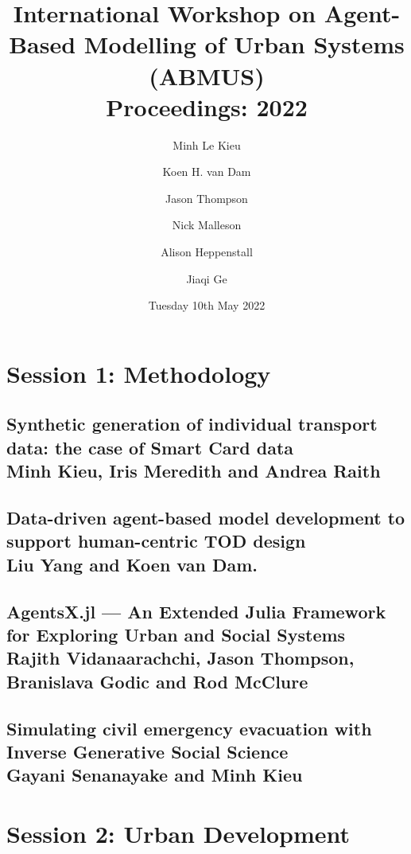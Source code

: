 \documentclass[a4paper,11pt]{article}
\begin{document}
\author{Minh Le Kieu \and Koen H. van Dam\and Jason Thompson \and Nick Malleson \and Alison Heppenstall \and Jiaqi Ge}
\title{International Workshop on Agent-Based Modelling of Urban Systems (ABMUS) \\ Proceedings: 2022}
\date{Tuesday 10th May 2022}

\maketitle
\newpage
\tableofcontents

\newpage

\section{Session 1: Methodology}

\subsection{Synthetic generation of individual transport data: the case of Smart Card data
 \\ Minh Kieu, Iris Meredith and Andrea Raith}
 

\subsection{Data-driven agent-based model development to support human-centric TOD design \\ Liu Yang and Koen van Dam. }
 

\subsection{AgentsX.jl — An Extended Julia Framework for Exploring Urban and Social Systems \\ Rajith Vidanaarachchi, Jason Thompson, Branislava Godic and Rod McClure}
 

\subsection{Simulating civil emergency evacuation with Inverse Generative Social Science \\ Gayani Senanayake and Minh Kieu}
 


\section{Session 2: Urban Development}
\end{document}
